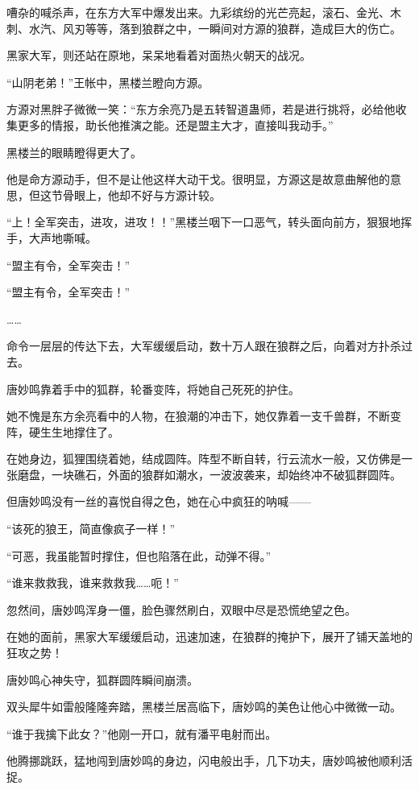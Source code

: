 \begin{this_body}
嘈杂的喊杀声，在东方大军中爆发出来。九彩缤纷的光芒亮起，滚石、金光、木刺、水汽、风刃等等，落到狼群之中，一瞬间对方源的狼群，造成巨大的伤亡。

黑家大军，则还站在原地，呆呆地看着对面热火朝天的战况。

“山阴老弟！”王帐中，黑楼兰瞪向方源。

方源对黑胖子微微一笑：“东方余亮乃是五转智道蛊师，若是进行挑将，必给他收集更多的情报，助长他推演之能。还是盟主大才，直接叫我动手。”

黑楼兰的眼睛瞪得更大了。

他是命方源动手，但不是让他这样大动干戈。很明显，方源这是故意曲解他的意思，但这节骨眼上，他却不好与方源计较。

“上！全军突击，进攻，进攻！！”黑楼兰咽下一口恶气，转头面向前方，狠狠地挥手，大声地嘶喊。

“盟主有令，全军突击！”

“盟主有令，全军突击！”

……

命令一层层的传达下去，大军缓缓启动，数十万人跟在狼群之后，向着对方扑杀过去。

唐妙鸣靠着手中的狐群，轮番变阵，将她自己死死的护住。

她不愧是东方余亮看中的人物，在狼潮的冲击下，她仅靠着一支千兽群，不断变阵，硬生生地撑住了。

在她身边，狐狸围绕着她，结成圆阵。阵型不断自转，行云流水一般，又仿佛是一张磨盘，一块礁石，外面的狼群如潮水，一波波袭来，却始终冲不破狐群圆阵。

但唐妙鸣没有一丝的喜悦自得之色，她在心中疯狂的呐喊——

“该死的狼王，简直像疯子一样！”

“可恶，我虽能暂时撑住，但也陷落在此，动弹不得。”

“谁来救救我，谁来救救我……呃！”

忽然间，唐妙鸣浑身一僵，脸色骤然刷白，双眼中尽是恐慌绝望之色。

在她的面前，黑家大军缓缓启动，迅速加速，在狼群的掩护下，展开了铺天盖地的狂攻之势！

唐妙鸣心神失守，狐群圆阵瞬间崩溃。

双头犀牛如雷般隆隆奔踏，黑楼兰居高临下，唐妙鸣的美色让他心中微微一动。

“谁于我擒下此女？”他刚一开口，就有潘平电射而出。

他腾挪跳跃，猛地闯到唐妙鸣的身边，闪电般出手，几下功夫，唐妙鸣被他顺利活捉。


\end{this_body}
